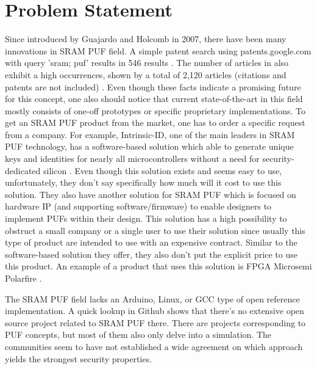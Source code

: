 \section{Problem Statement}\label{ch:problem}


Since introduced by Guajardo and Holcomb in 2007, there have been many innovations in SRAM PUF field. A simple patent search using patents.google.com with query 'sram; puf' results in 546 results \cite{google_patents}. The number of articles in  also exhibit a high occurrences, shown by a total of 2,120 articles (citations and patents are not included) \cite{google_scholar}.
Even though these facts indicate a promising future for this concept, one also should notice that current state-of-the-art in this field mostly consists of one-off prototypes or specific proprietary implementations.
To get an SRAM PUF product from the market, one has to order a specific request from a company. For example, Intrinsic-ID, one of the main leaders in SRAM PUF technology, has a software-based solution which able to generate unique keys and identities for nearly all microcontrollers without a need for security-dedicated silicon \cite{broadkey}. Even though this solution exists and seems easy to use, unfortunately, they don't say specifically how much will it cost to use this solution.
They also have another solution for SRAM PUF which is focused on hardware IP (and supporting software/firmware) to enable designers to implement PUFs within their design. This solution has a high possibility to obstruct a small company or a single user to use their solution since usually this type of product are intended to use with an expensive contract. Similar to the software-based solution they offer, they also don't put the explicit price to use this product. An example of a product that uses this solution is FPGA Microsemi Polarfire \cite{polarfire}.

The SRAM PUF field lacks an Arduino, Linux, or GCC type of open reference implementation. A quick lookup in Github shows that there's no extensive open source project related to SRAM PUF there. There are projects corresponding to PUF concepts, but most of them also only delve into a simulation.
The communities seem to have not established a wide agreement on which approach yields the strongest security properties.


